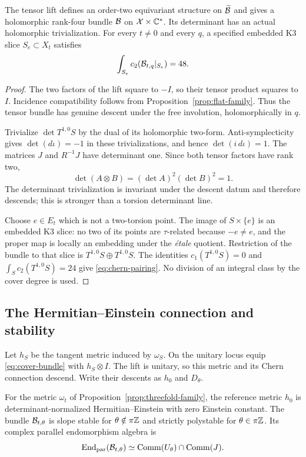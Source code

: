 \begin{proposition}\label{prop:bundle-descent}
The tensor lift defines an order-two equivariant structure on
$\widetilde{\mathcal B}$ and gives a holomorphic rank-four bundle $\mathcal B$ on
$\mathcal X\times\mathbb C^*$. Its determinant has an actual holomorphic
trivialization. For every $t\ne0$ and every $q$, a specified embedded
K3 slice $S_e\subset X_t$ satisfies
\begin{equation}\label{eq:chern-pairing}
 \int_{S_e}c_2(\mathcal B_{t,q}|_{S_e})=48.
\end{equation}
\end{proposition}

\begin{proof}
The two factors of the lift square to $-I$, so their tensor product
squares to $I$. Incidence compatibility follows from
Proposition~\ref{prop:flat-family}. Thus the tensor bundle has genuine
descent under the free involution, holomorphically in $q$.

Trivialize $\det T^{1,0}S$ by the dual of its holomorphic two-form.
Anti-symplecticity gives $\det(d\iota)=-1$ in these trivializations,
and hence $\det(i\,d\iota)=1$. The matrices $J$ and $R^{-1}J$ have
determinant one. Since both tensor factors have rank two,
\[
 \det(A\otimes B)=(\det A)^2(\det B)^2=1.
\]
The determinant trivialization is invariant under the descent datum
and therefore descends; this is stronger than a torsion determinant line.

Choose $e\in E_t$ which is not a two-torsion point. The image of
$S\times\{e\}$ is an embedded K3 slice: no two of its points are
$\tau$-related because $-e\ne e$, and the proper map is locally an
embedding under the \emph{\'{e}tale} quotient. Restriction of the bundle
to that slice is $T^{1,0}S\oplus T^{1,0}S$. The identities
$c_1(T^{1,0}S)=0$ and $\int_Sc_2(T^{1,0}S)=24$ give
\eqref{eq:chern-pairing}. No division of an integral class by the cover
degree is used.
\end{proof}

\subsection{The Hermitian--Einstein connection and stability}
Let $h_S$ be the tangent metric induced by $\omega_S$. On the unitary
locus equip \eqref{eq:cover-bundle} with $h_S\otimes I$.
The lift is unitary, so this metric and its Chern connection descend.
Write their descents as $h_0$ and $D_\theta$.

\begin{proposition}\label{prop:he-stability}
For the metric $\omega_t$ of Proposition~\ref{prop:threefold-family},
the reference metric $h_0$ is determinant-normalized Hermitian--Einstein
with zero Einstein constant. The bundle $\mathcal B_{t,\theta}$ is slope stable
for $\theta\notin\pi\mathbb Z$ and strictly polystable for $\theta\in\pi\mathbb Z$.
Its complex parallel endomorphism algebra is
\begin{equation}\label{eq:parallel-algebra}
 \operatorname{End}_{\rm par}(\mathcal B_{t,\theta})
 \simeq\operatorname{Comm}(U_\theta)\cap\operatorname{Comm}(J).
\end{equation}
\end{proposition}

